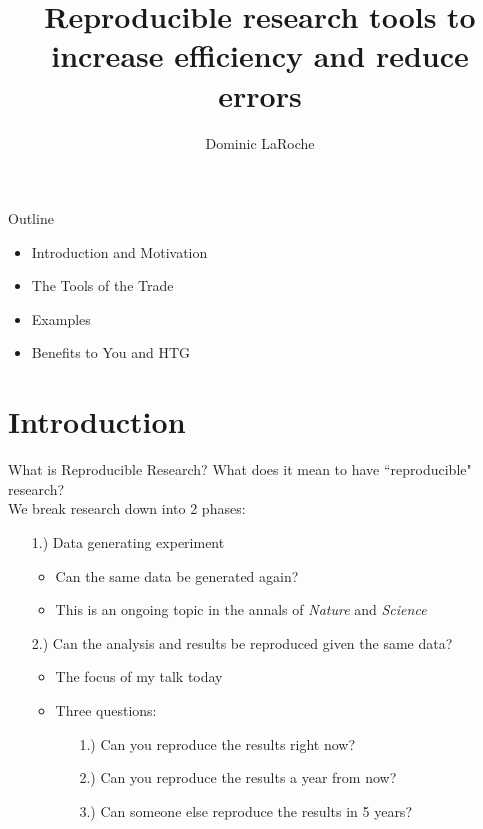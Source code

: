 \documentclass{beamer}\usepackage[]{graphicx}\usepackage[]{color}
\title[Reproducible Research Tools]{Reproducible research tools to increase efficiency and reduce errors}
\author[Dominic LaRoche]{Dominic LaRoche}
\begin{document}
\maketitle
\begin{frame}{Outline}
\begin{itemize}
\item Introduction and Motivation
\item The Tools of the Trade
\item Examples
\item Benefits to You and HTG
\end{itemize}
\end{frame}

\section{Introduction}

\begin{frame}{What is Reproducible Research?}
What does it mean to have ``reproducible" research?\\
\pause
\vspace{.5cm}
We break research down into 2 phases:\\
\pause
\begin{itemize}
\item[1.)] Data generating experiment
  \begin{itemize}
  \item Can the same data be generated again?
  \item This is an ongoing topic in the annals of \emph{Nature} and \emph{Science}
  \end{itemize}
\pause
\bigskip
\item[2.)] Can the analysis and results be reproduced given the same data?
  \begin{itemize}
  \item The focus of my talk today
  \pause
  \item Three questions:
    \begin{itemize}
    \item[1.)] Can you reproduce the results right now?
    \item[2.)] Can you reproduce the results a year from now?
    \item[3.)] Can someone else reproduce the results in 5 years?
    \end{itemize}
  \end{itemize}
\end{itemize}
\end{frame}
\end{document}
